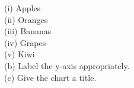 \documentclass{article}
\begin{document}
\begin{enumerate}
(i) Apples \\
(ii) Oranges \\
(iii) Bananas \\
(iv) Grapes \\
(v) Kiwi \\ 

(b) Label the y-axis appropriately. \\
(c) Give the chart a title.


    
\end{enumerate}
\end{document}

